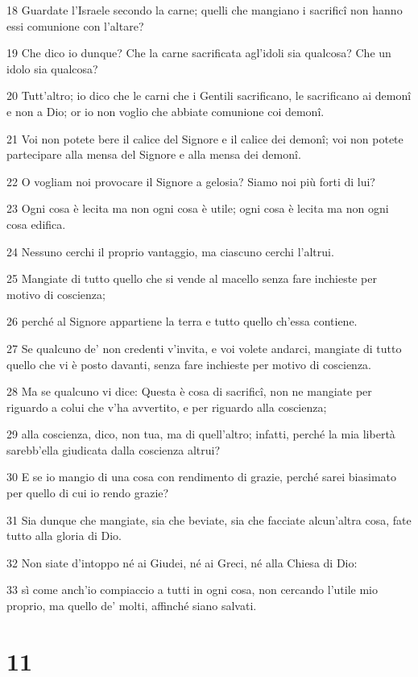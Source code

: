 \par 18 Guardate l'Israele secondo la carne; quelli che mangiano i sacrificî non hanno essi comunione con l'altare?
\par 19 Che dico io dunque? Che la carne sacrificata agl'idoli sia qualcosa? Che un idolo sia qualcosa?
\par 20 Tutt'altro; io dico che le carni che i Gentili sacrificano, le sacrificano ai demonî e non a Dio; or io non voglio che abbiate comunione coi demonî.
\par 21 Voi non potete bere il calice del Signore e il calice dei demonî; voi non potete partecipare alla mensa del Signore e alla mensa dei demonî.
\par 22 O vogliam noi provocare il Signore a gelosia? Siamo noi più forti di lui?
\par 23 Ogni cosa è lecita ma non ogni cosa è utile; ogni cosa è lecita ma non ogni cosa edifica.
\par 24 Nessuno cerchi il proprio vantaggio, ma ciascuno cerchi l'altrui.
\par 25 Mangiate di tutto quello che si vende al macello senza fare inchieste per motivo di coscienza;
\par 26 perché al Signore appartiene la terra e tutto quello ch'essa contiene.
\par 27 Se qualcuno de' non credenti v'invita, e voi volete andarci, mangiate di tutto quello che vi è posto davanti, senza fare inchieste per motivo di coscienza.
\par 28 Ma se qualcuno vi dice: Questa è cosa di sacrificî, non ne mangiate per riguardo a colui che v'ha avvertito, e per riguardo alla coscienza;
\par 29 alla coscienza, dico, non tua, ma di quell'altro; infatti, perché la mia libertà sarebb'ella giudicata dalla coscienza altrui?
\par 30 E se io mangio di una cosa con rendimento di grazie, perché sarei biasimato per quello di cui io rendo grazie?
\par 31 Sia dunque che mangiate, sia che beviate, sia che facciate alcun'altra cosa, fate tutto alla gloria di Dio.
\par 32 Non siate d'intoppo né ai Giudei, né ai Greci, né alla Chiesa di Dio:
\par 33 sì come anch'io compiaccio a tutti in ogni cosa, non cercando l'utile mio proprio, ma quello de' molti, affinché siano salvati.

\chapter{11}

